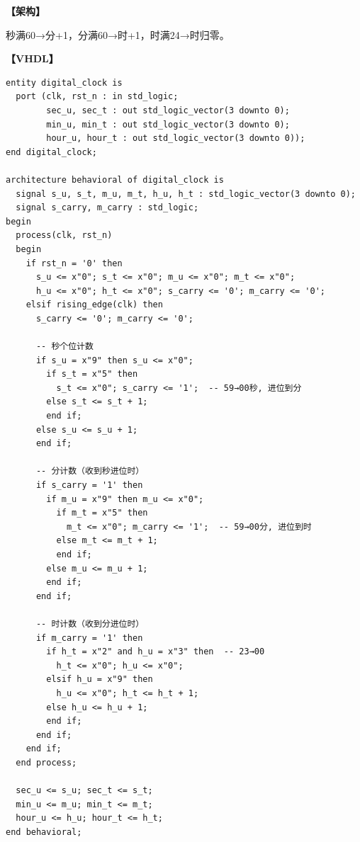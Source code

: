 \begin{solution}[完整解答]

\textbf{【架构】}
\begin{center}
\end{center}
秒满60→分+1，分满60→时+1，时满24→时归零。

\textbf{【VHDL】}
\begin{lstlisting}
entity digital_clock is
  port (clk, rst_n : in std_logic;
        sec_u, sec_t : out std_logic_vector(3 downto 0);
        min_u, min_t : out std_logic_vector(3 downto 0);
        hour_u, hour_t : out std_logic_vector(3 downto 0));
end digital_clock;

architecture behavioral of digital_clock is
  signal s_u, s_t, m_u, m_t, h_u, h_t : std_logic_vector(3 downto 0);
  signal s_carry, m_carry : std_logic;
begin
  process(clk, rst_n)
  begin
    if rst_n = '0' then
      s_u <= x"0"; s_t <= x"0"; m_u <= x"0"; m_t <= x"0";
      h_u <= x"0"; h_t <= x"0"; s_carry <= '0'; m_carry <= '0';
    elsif rising_edge(clk) then
      s_carry <= '0'; m_carry <= '0';

      -- 秒个位计数
      if s_u = x"9" then s_u <= x"0";
        if s_t = x"5" then
          s_t <= x"0"; s_carry <= '1';  -- 59→00秒, 进位到分
        else s_t <= s_t + 1;
        end if;
      else s_u <= s_u + 1;
      end if;

      -- 分计数（收到秒进位时）
      if s_carry = '1' then
        if m_u = x"9" then m_u <= x"0";
          if m_t = x"5" then
            m_t <= x"0"; m_carry <= '1';  -- 59→00分, 进位到时
          else m_t <= m_t + 1;
          end if;
        else m_u <= m_u + 1;
        end if;
      end if;

      -- 时计数（收到分进位时）
      if m_carry = '1' then
        if h_t = x"2" and h_u = x"3" then  -- 23→00
          h_t <= x"0"; h_u <= x"0";
        elsif h_u = x"9" then
          h_u <= x"0"; h_t <= h_t + 1;
        else h_u <= h_u + 1;
        end if;
      end if;
    end if;
  end process;

  sec_u <= s_u; sec_t <= s_t;
  min_u <= m_u; min_t <= m_t;
  hour_u <= h_u; hour_t <= h_t;
end behavioral;
\end{lstlisting}

\end{solution}


